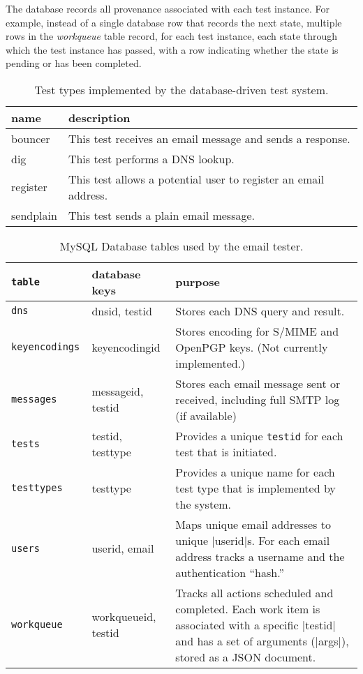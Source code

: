 \documentclass[preprint,3p,11pt]{elsarticle}
\begin{document}
The database records all provenance associated with each test
instance. For example, instead of a single database row that records
the next state, multiple rows in the \emph{workqueue} table record,
for each test instance, each state through which the test instance has
passed, with a row indicating whether the state is pending or has been
completed. 

\begin{table}
\begin{center}
\begin{tabularx}{\linewidth}{lX}
\hline
name & description \\
\hline
bouncer   & This test receives an email message and sends a response. \\
dig       & This test performs a DNS lookup.\\
register  & This test allows a potential user to register an email address. \\
sendplain & This test sends a plain email message.\\
\hline
\end{tabularx}
\end{center}
\caption{Test types implemented by the database-driven test system.\label{test-types}}
\end{table}


\begin{table}
\begin{tabular}{|>{\tt}llp{4in}|}
\hline
\textrm{table} & database keys & purpose \\
\hline
dns & dnsid, testid & Stores each DNS query and result. \\
keyencodings & keyencodingid & Stores encoding for S/MIME and OpenPGP keys. (Not currently implemented.) \\
messages & messageid, testid & Stores each email message sent or received, including full SMTP log (if available) \\
tests & testid, testtype & Provides a unique \texttt{testid} for each test that is initiated.\\
testtypes & testtype & Provides a unique name for each test type that is implemented by the system.\\
users & userid, email & Maps unique email addresses to unique |userid|s. For each email address tracks a username and the authentication ``hash.''\\
workqueue & workqueueid, testid & Tracks all actions scheduled and completed. Each work item is associated with a specific |testid| and has a set of arguments (|args|), stored as a JSON document.\\
\hline
\end{tabular}
\caption{MySQL Database tables used by the email tester.}\label{db}
\end{table}
\end{document}
